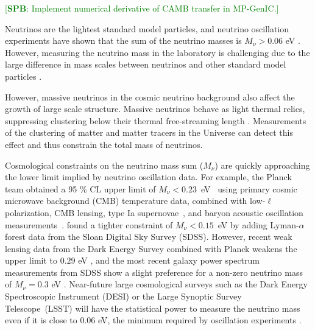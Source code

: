 \documentclass[useAMS, usenatbib]{mnras}
\newcommand{\spb}[1]{{\textcolor{green}{[{\bf SPB}: #1]}}}
\begin{document}
\spb{Implement numerical derivative of CAMB transfer in MP-GenIC.}

Neutrinos are the lightest standard model particles, and neutrino oscillation experiments have shown that the sum of the neutrino masses is $M_\nu > 0.06$ eV \citep{Becker-Szendy_1992, Fukuda_1998}.
However, measuring the neutrino mass in the laboratory is challenging due to the large difference in mass scales between neutrinos and other standard model particles \cite[although see][]{Wolf_2010}.

However, massive neutrinos in the cosmic neutrino background also affect the growth of large scale structure.
Massive neutrinos behave as light thermal relics, suppressing clustering below their thermal
free-streaming length \citep[e.g.][]{Lesgourgues_2006, Wong_2011}.
Measurements of the clustering of matter and matter tracers in the Universe can detect this effect and thus constrain the total mass of neutrinos.

Cosmological constraints on the neutrino mass sum ($M_\nu$) are quickly approaching the lower limit implied by neutrino oscillation data. For example, the Planck team obtained a 95 \% CL upper limit of $M_\nu<0.23$~eV~\citep{planck2015xiii} using primary cosmic microwave background (CMB) temperature data, combined with low-$\ell$ polarization, CMB lensing, type Ia supernovae~\citep{Betoule_2014}, and baryon acoustic oscillation
measurements~\citep{Beutler_2011, Anderson_2014, Ross_2015}. \cite{Palanque_2015} found a tighter constraint of $M_\nu<0.15$~eV by adding Lyman-$\alpha$ forest data from the Sloan Digital Sky Survey (SDSS). However, recent weak lensing data from the Dark Energy Survey combined with Planck weakens the upper limit to $0.29$ eV \citep{DES_2017}, and the most recent galaxy power spectrum measurements from SDSS show a slight preference for a non-zero neutrino mass of $M_\nu = 0.3$ eV \citep{Beutler_2014}.
Near-future large cosmological surveys such as the Dark Energy Spectroscopic Instrument (DESI) \citep{DESI} or the
Large Synoptic Survey Telescope~(LSST) \citep{LSST, Joudaki_2012} will have the statistical power to measure the neutrino mass even if it is close to $0.06$ eV, the minimum required by oscillation experiments \citep{Abazajian_2015}.
\end{document}
